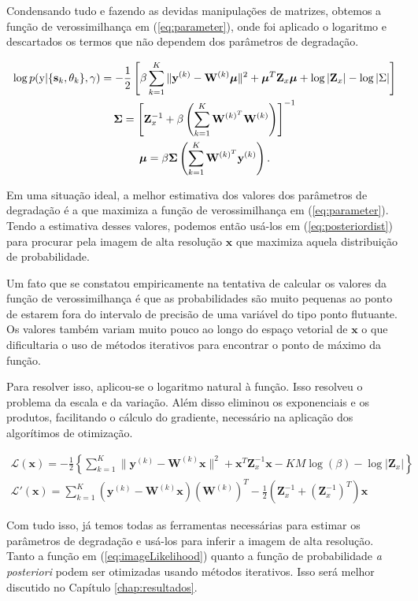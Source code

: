 Condensando tudo e fazendo as devidas manipulações de matrizes, obtemos a função de verossimilhança em (\ref{eq:parameter}), onde foi aplicado o logaritmo e descartados os termos que não dependem dos parâmetros de degradação.

\begin{gather}
	\label{eq:parameter}
	\log p(\mathrm{y}|\{\mathbf{s}_k,\theta_k\}, \gamma) = -\frac{1}{2}\left[\beta \sum^K_{k=1} \|\mathbf{y}^{(k)} - \mathbf{W}^{(k)}\boldsymbol{\mu}\|^2
    + \boldsymbol{\mu}^T\mathbf{Z}_x \boldsymbol{\mu}
    \vphantom{\int_t} + \log |\mathbf{Z}_x| - \log{|\Sigma |} \right] \\
	\mathbf{ \Sigma }= \left[\mathbf{Z}^{-1}_x + \beta \left( \sum^K_{k = 1} \mathbf{W}^{(k)^T} \mathbf{W}^{(k)} \right) \right]^{-1} \\
	\boldsymbol{\mu} = \beta \mathbf{ \Sigma } \left( \sum^K_{k=1} \mathbf{W}^{(k)^T}\mathbf{y}^{(k)} \right).
\end{gather}

Em uma situação ideal, a melhor estimativa dos valores dos parâmetros de degradação é a que maximiza a função de verossimilhança em (\ref{eq:parameter}).
Tendo a estimativa desses valores, podemos então usá-los em (\ref{eq:posteriordist}) para procurar pela imagem de alta resolução $\mathbf{x}$ que maximiza aquela distribuição de probabilidade.

Um fato que se constatou empiricamente na tentativa de calcular os valores da função de verossimilhança é que as probabilidades são muito pequenas ao ponto de estarem fora do intervalo de precisão de uma variável do tipo ponto flutuante.
Os valores também variam muito pouco ao longo do espaço vetorial de $\mathbf{x}$ o que dificultaria o uso de métodos iterativos para encontrar o ponto de máximo da função.


Para resolver isso, aplicou-se o logaritmo natural à função. Isso resolveu o problema da escala e da variação.
Além disso eliminou os exponenciais e os produtos, facilitando o cálculo do gradiente, necessário na aplicação dos algorítimos de otimização.

\begin{gather}
	\label{eq:imageLikelihood} \mathcal{L}(\mathbf{x}) = -\frac{1}{2} \left\{ \sum^K_{k=1} \|\mathbf{y}^{(k)} - \mathbf{W}^{(k)} \mathbf{x} \|^2 + \mathbf{x}^T\mathbf{Z}^{-1}_x\mathbf{x} - KM\log{(\beta)} - \log{|\mathbf{Z}_x|} \right\} \\ 
	\label{eq:imageLikelihood_gradient} \mathcal{L}'(\mathbf{x}) =  \sum^K_{k=1}  (\mathbf{y}^{(k)} - \mathbf{W}^{(k)}\mathbf{x})(\mathbf{W}^{(k)})^T  - \frac{1}{2}(\mathbf{Z}^{-1}_x + (\mathbf{Z}^{-1}_x)^T)\mathbf{x}  
\end{gather}

Com tudo isso, já temos todas as ferramentas necessárias para estimar os parâmetros de degradação e usá-los para inferir a imagem de alta resolução.
Tanto a função em (\ref{eq:imageLikelihood}) quanto a função de probabilidade \emph{a posteriori} podem ser otimizadas usando métodos iterativos.
Isso será melhor discutido no Capítulo \ref{chap:resultados}.

